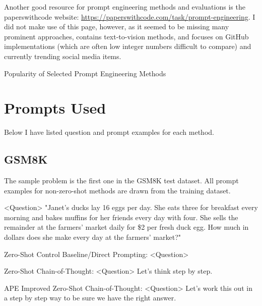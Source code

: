 \documentclass[11pt]{article}
\begin{document}
Another good resource for prompt engineering methods and evaluations is the paperswithcode website: \url{https://paperswithcode.com/task/prompt-engineering}. I did not make use of this page, however, as it seemed to be missing many prominent approaches, contains text-to-vision methods, and focuses on GitHub implementations (which are often low integer numbers difficult to compare) and currently trending social media items.

\begin{landscape}

  \begin{centering}

    \begin{table}[h]
      \caption{Popularity of Selected Prompt Engineering Methods}
      \small
      
      \label{tab:method_pop}
    \end{table}

  \end{centering}

\end{landscape}

\section{Prompts Used}

Below I have listed question and prompt examples for each method.
\subsection{GSM8K}

The sample problem is the first one in the GSM8K test dataset. All prompt examples for non-zero-shot methods are drawn from the training dataset.

<Question> "Janet's ducks lay 16 eggs per day. She eats three for breakfast every morning and bakes muffins for her friends every day with four. She sells the remainder at the farmers' market daily for \$2 per fresh duck egg. How much in dollars does she make every day at the farmers' market?"

Zero-Shot Control Baseline/Direct Prompting:
<Question>

Zero-Shot Chain-of-Thought:
<Question>
Let's think step by step.

APE Improved Zero-Shot Chain-of-Thought:
<Question>
Let's work this out in a step by step way to be sure we have the right answer.
\end{document}
